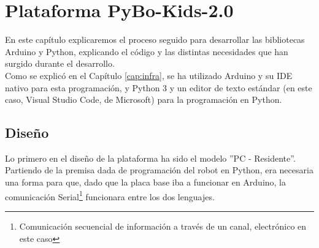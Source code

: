 \chapter{Plataforma PyBo-Kids-2.0}
\label{cap:PyBoKids}
En este capítulo explicaremos el proceso seguido para desarrollar las bibliotecas Arduino y Python, explicando el código y las distintas necesidades que han surgido durante el desarrollo. \\
Como se explicó en el Capítulo \ref{cap:infra}, se ha utilizado Arduino  y su IDE nativo para esta programación, y Python 3 y un editor de texto estándar (en este caso, Visual Studio Code, de Microsoft) para la programación en Python. 

\section{Diseño}\label{sec:diseño}
Lo primero en el diseño de la plataforma ha sido el modelo ''PC - Residente''. Partiendo de la premisa dada de programación del robot en Python, era necesaria una forma para que, dado que la placa base iba a funcionar en Arduino, la comunicación Serial\footnote{Comunicación secuencial de información a través de un canal, electrónico en este caso} funcionara entre los dos lenguajes. \\

